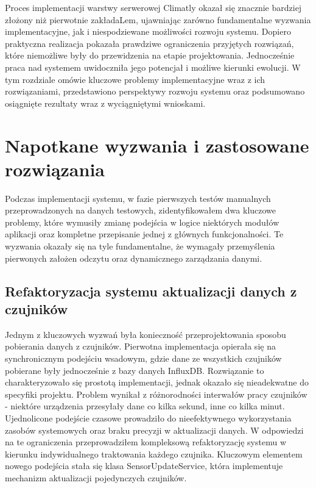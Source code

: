 \documentclass[a4paper,12pt,openany]{book}
\begin{document}
Proces implementacji warstwy serwerowej Climatly okazał się znacznie bardziej złożony niż pierwotnie zakładaLem, ujawniając zarówno fundamentalne wyzwania implementacyjne, jak i niespodziewane możliwości rozwoju systemu. Dopiero praktyczna realizacja pokazała prawdziwe ograniczenia przyjętych rozwiązań, które niemożliwe były do przewidzenia na etapie projektowania. Jednocześnie praca nad systemem uwidoczniła jego potencjał i możliwe kierunki ewolucji. W tym rozdziale omówie kluczowe problemy implementacyjne wraz z ich rozwiązaniami, przedstawiono perspektywy rozwoju systemu oraz podsumowano osiągnięte rezultaty wraz z  wyciągniętymi wnioskami.

\section{Napotkane wyzwania i zastosowane rozwiązania}

Podczas implementacji systemu, w fazie pierwszych testów manualnych przeprowadzonych na danych testowych, zidentyfikowałem dwa kluczowe problemy, które wymusiły zmianę podejścia w logice niektórych modułów aplikacji oraz kompletne przepisanie jednej z głównych funkcjonalności. Te wyzwania okazały się na tyle fundamentalne, że wymagały przemyślenia pierwonych założen odczytu oraz dynamicznego zarządzania danymi.

\subsection*{Refaktoryzacja systemu aktualizacji danych z czujników}

Jednym z kluczowych wyzwań była konieczność przeprojektowania sposobu pobierania danych z czujników. Pierwotna implementacja opierała się na synchronicznym podejściu wsadowym, gdzie dane ze wszystkich czujników pobierane były jednocześnie z bazy danych InfluxDB. Rozwiązanie to charakteryzowało się prostotą implementacji, jednak okazało się nieadekwatne do specyfiki projektu.
Problem wynikał z różnorodności interwałów pracy czujników - niektóre urządzenia przesyłały dane co kilka sekund, inne co kilka minut. Ujednolicone podejście czasowe prowadziło do nieefektywnego wykorzystania zasobów systemowych oraz braku precyzji w aktualizacji danych.
W odpowiedzi na te ograniczenia przeprowadziłem kompleksową refaktoryzację systemu w kierunku indywidualnego traktowania każdego czujnika. Kluczowym elementem nowego podejścia stała się klasa SensorUpdateService, która implementuje mechanizm aktualizacji pojedynczych czujników.
\end{document}
